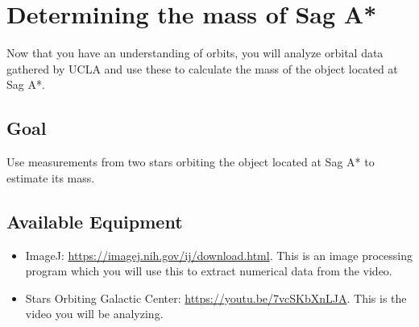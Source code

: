 	
	

\section{Determining the mass of Sag A*}
Now that you have an understanding of orbits, you will analyze orbital data gathered by UCLA and use these to calculate the mass of the object located at Sag A*.

\subsection{Goal}

Use measurements from two stars orbiting the object located at Sag A* to estimate its mass. 

\subsection{Available Equipment}
\begin{itemize}
	\item ImageJ: \url{https://imagej.nih.gov/ij/download.html}. This is an image processing program which you will use this to extract numerical data from the video.
	\item Stars Orbiting Galactic Center: \url{https://youtu.be/7vcSKbXnLJA}. This is the video you will be analyzing.
\end{itemize}

